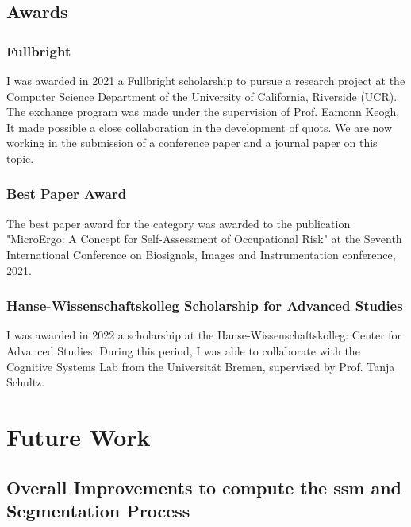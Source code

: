 \subsection{Awards}

\subsubsection{Fullbright}

I was awarded in 2021 a Fullbright scholarship to pursue a research project at the Computer Science Department of the University of California, Riverside (UCR). The exchange program was made under the supervision of Prof. Eamonn Keogh. It made possible a close collaboration in the development of \gls{quots}. We are now working in the submission of a conference paper and a journal paper on this topic.

\subsubsection{Best Paper Award}

The best paper award for the category was awarded to the publication "MicroErgo: A Concept for Self-Assessment of Occupational Risk" at the Seventh International Conference on Biosignals, Images and Instrumentation conference, 2021.

\subsubsection{Hanse-Wissenschaftskolleg Scholarship for Advanced Studies}

I was awarded in 2022 a scholarship at the Hanse-Wissenschaftskolleg: Center for Advanced Studies. During this period, I was able to collaborate with the Cognitive Systems Lab from the Universität Bremen, supervised by Prof. Tanja Schultz. 

\section{Future Work}

\subsection{Overall Improvements to compute the \gls{ssm} and Segmentation Process}

